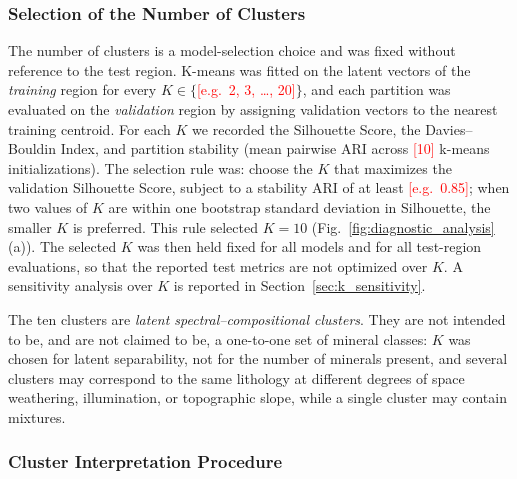 \documentclass[pdflatex,sn-mathphys-num]{sn-jnl}
\newcommand{\fillin}[1]{\textcolor{red}{[#1]}}
\begin{document}
\subsubsection{Selection of the Number of Clusters}
\label{sec:k_selection}

The number of clusters is a model-selection choice and was fixed without reference to the test region. K-means was fitted on the latent vectors of the \emph{training} region for every $K\in\{$\fillin{e.g.\ 2, 3, \ldots, 20}$\}$, and each partition was evaluated on the \emph{validation} region by assigning validation vectors to the nearest training centroid. For each $K$ we recorded the Silhouette Score, the Davies--Bouldin Index, and partition stability (mean pairwise ARI across \fillin{10} k-means initializations). The selection rule was: choose the $K$ that maximizes the validation Silhouette Score, subject to a stability ARI of at least \fillin{e.g.\ 0.85}; when two values of $K$ are within one bootstrap standard deviation in Silhouette, the smaller $K$ is preferred. This rule selected $K=10$ (Fig.~\ref{fig:diagnostic_analysis}(a)). The selected $K$ was then held fixed for all models and for all test-region evaluations, so that the reported test metrics are not optimized over $K$. A sensitivity analysis over $K$ is reported in Section~\ref{sec:k_sensitivity}.

The ten clusters are \emph{latent spectral--compositional clusters}. They are not intended to be, and are not claimed to be, a one-to-one set of mineral classes: $K$ was chosen for latent separability, not for the number of minerals present, and several clusters may correspond to the same lithology at different degrees of space weathering, illumination, or topographic slope, while a single cluster may contain mixtures.

\subsubsection{Cluster Interpretation Procedure}
\label{sec:interpretation}
\end{document}
